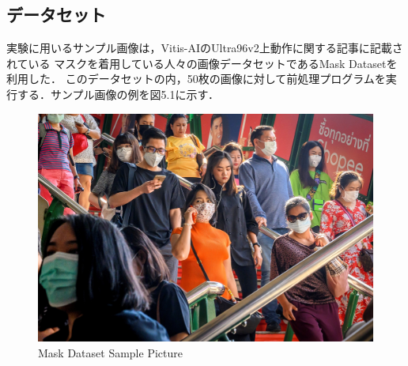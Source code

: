 \documentclass[11pt,a4j]{jreport}
\begin{document}
\subsection{データセット}
実験に用いるサンプル画像は，Vitis-AIのUltra96v2上動作に関する記事\cite{SamplePictWeb}に記載されている
マスクを着用している人々の画像データセットであるMask Dataset\cite{SamplePictDrive}を利用した．
このデータセットの内，50枚の画像に対して前処理プログラムを実行する．サンプル画像の例を図5.1に示す．
\begin{figure}[H]
  \center
  \includegraphics[scale = 0.17]{pict/Mask_1.jpg}
  \caption{Mask Dataset Sample Picture}
\end{figure}
\end{document}
